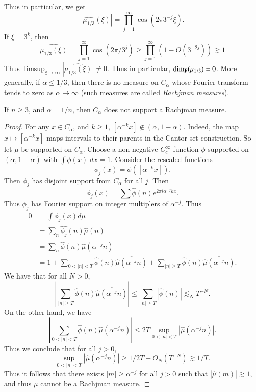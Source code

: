 Thus in particular, we get
%
\[ |\widehat{\mu_{1/3}}(\xi)| = \prod_{j = 1}^\infty \cos(2 \pi 3^{-j} \xi). \]
%
If $\xi = 3^k$, then
%
\[ \widehat{\mu_{1/3}(\xi)} = \prod_{j = 1}^\infty \cos(2 \pi / 3^j) \geq \prod_{j = 1}^\infty (1 - O(3^{-2j})) \gtrsim 1 \]
%
Thus $\limsup_{\xi \to \infty} |\widehat{\mu_{1/3}(\xi)}| \neq 0$. Thus in particular, $\operatorname{\dim_{\mathbf{F}}}(\mu_{1/3}) = 0$. More generally, if $\alpha \leq 1/3$, then there is no measure on $C_\alpha$ whose Fourier transform tends to zero as $\alpha \to \infty$ (such measures are called \emph{Rachjman measures}).

\begin{theorem}
  If $n \geq 3$, and $\alpha = 1/n$, then $C_\alpha$ does not support a Rachjman measure.
\end{theorem}
\begin{proof}
  For any $x \in C_\alpha$, and $k \geq 1$, $[\alpha^{-k} x] \not \in (\alpha, 1 - \alpha)$. Indeed, the map $x \mapsto [\alpha^{-k} x]$ maps intervals to their parents in the Cantor set construction. So let $\mu$ be supported on $C_\alpha$. Choose a non-negative $C_c^\infty$ function $\phi$ supported on $(\alpha, 1 - \alpha)$ with $\int \phi(x)\; dx = 1$. Consider the rescaled functions
  \[ \phi_j(x) = \phi( [ \alpha^{-k} x ] ). \]
  Then $\phi_j$ has disjoint support from $C_\alpha$ for all $j$. Then
  \[ \phi_j(x) = \sum \widehat{\phi}(n) e^{2 \pi i \alpha^{-j} k x}. \]
  Thus $\phi_j$ has Fourier support on integer multiplers of $\alpha^{-j}$. Thus
  \begin{align*}
    0 &= \int \phi_j(x) d\mu\\
    &= \sum_n \widehat{\phi_j}(n) \overline{\widehat{\mu}(n)}\\
    &= \sum_n \widehat{\phi}(n) \overline{\widehat{\mu}(\alpha^{-j} n)}\\
    &= 1 + \sum_{0 < |n| < T} \widehat{\phi}(n) \overline{\widehat{\mu}(\alpha^{-j} n)} + \sum_{|n| \geq T} \widehat{\phi}(n) \overline{\widehat{\mu}(\alpha^{-j} n)}.
  \end{align*}
  We have that for all $N > 0$,
  \[ \left| \sum_{|n| \geq T} \widehat{\phi}(n) \overline{\widehat{\mu}(\alpha^{-j} n)} \right| \leq \sum_{|n| \geq T} |\widehat{\phi}(n)| \lesssim_N T^{-N}. \]
  On the other hand, we have
  \[ \left| \sum_{0 < |n| < T} \widehat{\phi}(n) \overline{\widehat{\mu}(\alpha^{-j} n)} \right| \leq 2T \sup_{0 < |n| < T} |\widehat{\mu}(\alpha^{-j} n)|. \]
  Thus we conclude that for all $j > 0$,
  \[ \sup_{0 < |n| < T} |\widehat{\mu}(\alpha^{-j} n)| \geq 1/2T - O_N(T^{-N}) \gtrsim 1/T. \]
  Thus it follows that there exists $|m| \geq \alpha^{-j}$ for all $j > 0$ such that $|\widehat{\mu}(m)| \gtrsim 1$, and thus $\mu$ cannot be a Rachjman measure.
\end{proof}

